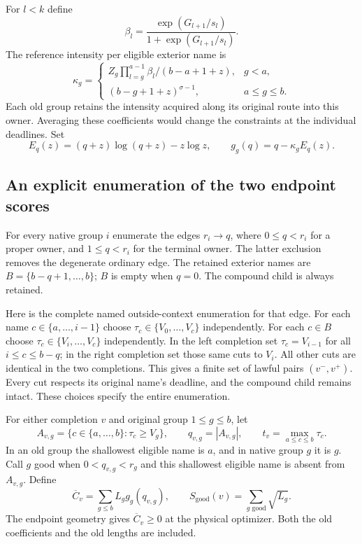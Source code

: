 For $l<k$ define
\[
 \beta_l=\frac{\exp(G_{l+1}/s_l)}{1+\exp(G_{l+1}/s_l)}.
\]
The reference intensity per eligible exterior name is
\begin{equation}
 \kappa_g=
 \begin{cases}
 Z_g\displaystyle\prod_{l=g}^{a-1}\beta_l/(b-a+1+z),&g<a,\\
 (b-g+1+z)^{\sigma-1},&a\leq g\leq b.
 \end{cases}
 \label{profile:old-coefficients}
\end{equation}
Each old group retains the intensity acquired along its original route
into this owner. Averaging these coefficients would change the
constraints at the individual deadlines. Set
\[
 E_q(z)=(q+z)\log(q+z)-z\log z,\qquad
 g_g(q)=q-\kappa_gE_q(z).
\]

\subsection{An explicit enumeration of the two endpoint scores}
For every native group $i$ enumerate the edges $r_i\to q$, where
$0\leq q<r_i$ for a proper owner, and $1\leq q<r_i$ for the terminal
owner. The latter exclusion removes the degenerate ordinary edge.
The retained exterior names are $B=\{b-q+1,\ldots,b\}$; $B$ is empty
when $q=0$. The compound child is always retained.

Here is the complete named outside-context enumeration for that edge.
For each name $c\in\{a,\ldots,i-1\}$ choose
$\tau_c\in\{V_0,\ldots,V_c\}$ independently. For each $c\in B$ choose
$\tau_c\in\{V_i,\ldots,V_c\}$ independently. In the left completion
set $\tau_c=V_{i-1}$ for all $i\leq c\leq b-q$; in the right completion
set those same cuts to $V_i$. All other cuts are identical in the two
completions. This gives a finite set of lawful pairs $(v^-,v^+)$.
Every cut respects its original name's deadline, and the compound child
remains intact. These choices specify the entire enumeration.

For either completion $v$ and original group $1\leq g\leq b$, let
\[
 A_{v,g}=\{c\in\{a,\ldots,b\}:\tau_c\geq V_g\},
 \qquad q_{v,g}=|A_{v,g}|,
 \qquad t_v=\max_{a\leq c\leq b}\tau_c.
\]
In an old group the shallowest eligible name is $a$, and in native
group $g$ it is $g$. Call $g$ good when $0<q_{v,g}<r_g$ and this
shallowest eligible name is absent from $A_{v,g}$. Define
\begin{equation}
 \overline C_v=\sum_{g\leq b}L_gg_g(q_{v,g}),\qquad
 S_{\mathrm{good}}(v)=\sum_{g\text{ good}}\sqrt{L_g}.
 \label{profile:reference}
\end{equation}
The endpoint geometry gives $\overline C_v\geq0$ at the physical
optimizer. Both the old coefficients and the old lengths are included.

